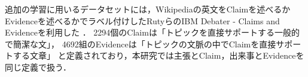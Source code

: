 \documentclass[a4paper, twocolumn, 10pt]{jarticle}
\makeatletter
\def\subsection{%
	\@startsection{subsection}{1}{\z@}%
	{.1\Cvs \@plus.1\Cdp \@minus.1\Cdp}%
	{.1\Cvs \@plus.1\Cdp}%
	{\normalfont\normalsize\bfseries}%
}
\makeatother
\begin{document}
追加の学習に用いるデータセットには，Wikipediaの英文をClaimを述べるかEvidenceを述べるかでラベル付けしたRutyらのIBM Debater - Claims and Evidenceを利用した
．
2294個のClaimは「トピックを直接サポートする一般的で簡潔な文」，
4692組のEvidenceは「トピックの文脈の中でClaimを直接サポートする文章」
と定義されており，本研究では主張とClaim，出来事とEvidenceを同じ定義で扱う．







\end{document}
